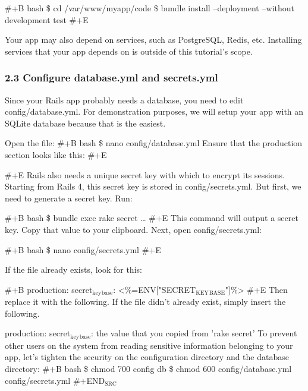 \documentclass[11pt]{article}
\begin{document}
\#+B bash
\$ cd /var/www/myapp/code
\$ bundle install --deployment --without development test
\#+E

Your app may also depend on services, such as PostgreSQL, Redis, etc. Installing services that your app depends on is outside of this tutorial's scope.

\subsubsection{2.3 Configure database.yml and secrets.yml}
\label{sec:org8fb94a8}

Since your Rails app probably needs a database, you need to edit config/database.yml. For demonstration purposes, we will setup your app with an SQLite database because that is the easiest.

Open the file:
\#+B bash
\$ nano config/database.yml
Ensure that the production section looks like this:
\#+E


\#+E
Rails also needs a unique secret key with which to encrypt its sessions. Starting from Rails 4, this secret key is stored in config/secrets.yml. But first, we need to generate a secret key. Run:


\#+B bash
\$ bundle exec rake secret
\ldots{}
\#+E
This command will output a secret key. Copy that value to your clipboard. Next, open config/secrets.yml:

\#+B bash
\$ nano config/secrets.yml
\#+E

If the file already exists, look for this:

\#+B
production:
  secret\(_{\text{key}}\)\(_{\text{base}}\): <\%=ENV["SECRET\(_{\text{KEY}}\)\(_{\text{BASE}}\)"]\%>
\#+E
Then replace it with the following. If the file didn't already exist, simply insert the following.


production:
  secret\(_{\text{key}}\)\(_{\text{base}}\): the value that you copied from 'rake secret'
To prevent other users on the system from reading sensitive information belonging to your app, let's tighten the security on the configuration directory and the database directory:
\#+B bash
\$ chmod 700 config db
\$ chmod 600 config/database.yml config/secrets.yml
\#+END\(_{\text{SRC}}\)
\end{document}

